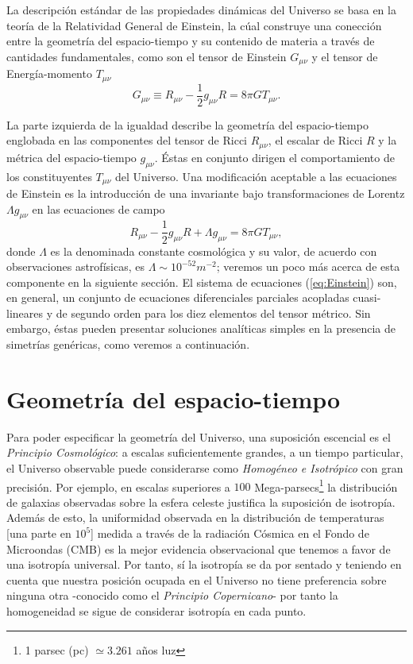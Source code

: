 \documentclass[10.5pt,prb,
               showpacs,            %
               preprintnumbers,     %
               aps,                 %
               prl,          	    %
               letterpaper,             %
               superscriptaddress,      %
               nofootinbib,         %
               tightenlines,        %
               floats,floatfix      %
               ,usenatbib]{revtex4-1}%
\def\beq{\begin{equation}}
\def\eeq{\end{equation}}
\begin{document}
La descripci\'on est\'andar de las propiedades din\'amicas del Universo se basa en la teor\'ia 
de la Relatividad General de Einstein, la c\'ual construye una conecci\'on entre la geometr\'ia del 
espacio-tiempo y su contenido de materia a trav\'es de cantidades fundamentales, como son el 
tensor de Einstein $G_{\mu \nu}$ y el tensor de Energ\'ia-momento $T_{\mu \nu}$
%
	\beq  \label{eq:Ricci}
		G_{\mu \nu} \equiv R_{\mu \nu} - \frac{1}{2}g_{\mu \nu}R =  8\pi G T_{\mu \nu}.
	\eeq
 
 \noindent
La parte izquierda de la igualdad describe la geometr\'ia del espacio-tiempo englobada en las 
componentes del tensor de Ricci $R_{\mu \nu}$, el escalar de Ricci $R$ y la m\'etrica del espacio-tiempo
$g_{\mu \nu}$. \'Estas en conjunto dirigen el comportamiento de los constituyentes $T_{\mu \nu}$ del Universo.
Una modificaci\'on aceptable a las ecuaciones de Einstein es la introducci\'on de una  invariante
bajo transformaciones de Lorentz $\Lambda g_{\mu \nu}$ en las ecuaciones de campo
%
	\beq \label{eq:Einstein}
		R_{\mu \nu} - \frac{1}{2}g_{\mu \nu}R + \Lambda g_{\mu \nu}=  8\pi G T_{\mu \nu},
	\eeq
%
donde $\Lambda$ es la denominada constante cosmol\'ogica y su valor, de acuerdo con observaciones astrof\'isicas,
es $\Lambda \sim10^{-52} m^{-2}$; veremos un poco m\'as acerca de esta componente en la siguiente secci\'on.
El sistema de ecuaciones (\ref{eq:Einstein}) son, en general, un conjunto de ecuaciones diferenciales parciales acopladas 
cuasi-lineares y de segundo orden para los diez elementos del tensor m\'etrico. Sin embargo, \'estas pueden 
presentar soluciones anal\'iticas simples en la presencia de simetr\'ias gen\'ericas, como veremos a continuaci\'on.



\section{Geometr\'ia del espacio-tiempo}


Para poder especificar la geometr\'ia del Universo, una suposici\'on escencial es el \textit{Principio Cosmol\'ogico}:
a escalas suficientemente grandes, a un tiempo particular, el Universo observable 
puede considerarse como \textit{Homog\'eneo e Isotr\'opico} con gran precisi\'on.
Por ejemplo, en escalas superiores a $100$ Mega-parsecs\footnote[1]{1 parsec (pc) $\simeq 3.261$ a\~nos luz} 
la distribuci\'on de galaxias observadas sobre la esfera celeste justifica la suposici\'on de isotrop\'ia. 
%
Adem\'as de esto, la uniformidad
observada en la distribuci\'on de temperaturas [una parte en $10^5$] medida a trav\'es de la radiaci\'on C\'osmica en el Fondo de
Microondas (CMB) es la mejor evidencia observacional que tenemos a favor de una 
isotrop\'ia universal. Por tanto, s\'i la isotrop\'ia se da por sentado y teniendo en cuenta que nuestra
posici\'on ocupada en el Universo no tiene preferencia sobre ninguna otra -conocido como el \textit{Principio 
Copernicano}- por tanto la homogeneidad se sigue de considerar isotrop\'ia en cada punto.
 \\
 
\end{document}
